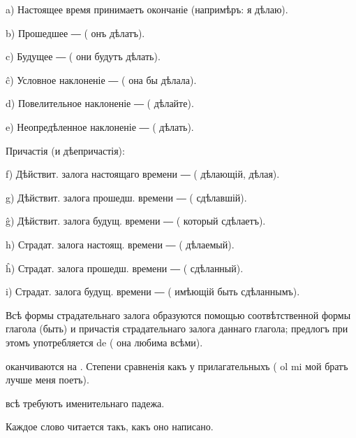         a) Настоящее время принимаетъ окончаніе  (напримѣръ:  я дѣлаю).
        
        b) Прошедшее ―  ( онъ дѣлатъ).
        
        c) Будущее ―  ( они будутъ дѣлать).
        
        ĉ) Условное наклоненіе ―  ( она бы дѣлала).
        
        d) Повелительное наклоненіе ―  ( дѣлайте).
        
        e) Неопредѣленное наклоненіе ―  ( дѣлать).
        
\begin{center}
Причастія (и дѣепричастія):
\end{center}
    
        f) Дѣйствит. залога настоящаго времени ―  ( дѣлающій,  дѣлая).
        
        g) Дѣйствит. залога прошедш. времени ―  ( сдѣлавшій).
        
        ĝ) Дѣйствит. залога будущ. времени ―  ( который сдѣлаетъ).
        
        h) Страдат. залога настоящ. времени ―  ( дѣлаемый).
        
        ĥ) Страдат. залога прошедш. времени ―  ( сдѣланный).
        
        i) Страдат. залога будущ. времени ―  ( имѣющій быть сдѣланнымъ).

    Всѣ формы страдательнаго залога образуются помощью соотвѣтственной формы глагола  (быть) и причастія страдательнаго залога даннаго глагола; предлогъ при этомъ употребляется de (  она любима всѣми).
    
     оканчиваются на . Степени сравненія какъ у прилагательныхъ (  ol mi мой братъ лучше меня поетъ).
    
     всѣ требуютъ именительнаго падежа.

\begin{samepage} 
\begin{center}
{\large{}}
\end{center}

     Каждое слово читается такъ, какъ оно написано.
\end{samepage}

